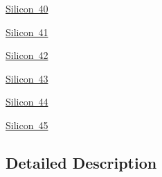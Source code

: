 \begin{DoxyCompactItemize}
\item 
\mbox{\hyperlink{group___isotope_const-_silicon-_si40}{Silicon 40}}
\item 
\mbox{\hyperlink{group___isotope_const-_silicon-_si41}{Silicon 41}}
\item 
\mbox{\hyperlink{group___isotope_const-_silicon-_si42}{Silicon 42}}
\item 
\mbox{\hyperlink{group___isotope_const-_silicon-_si43}{Silicon 43}}
\item 
\mbox{\hyperlink{group___isotope_const-_silicon-_si44}{Silicon 44}}
\item 
\mbox{\hyperlink{group___isotope_const-_silicon-_si45}{Silicon 45}}
\end{DoxyCompactItemize}


\subsection{Detailed Description}
